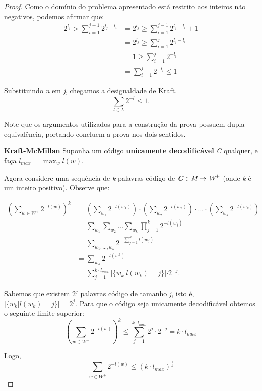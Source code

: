 \begin{lemma}
\begin{proof}
Como o domínio do problema apresentado está restrito aos inteiros não negativos, podemos afirmar que:
\begin{align*}
2^{l_j} > \sum_{i=1}^{j-1} 2^{l_j - l_i} &= 2^{l_j} \geq \sum_{i=1}^{j-1} 2^{l_j - l_i} + 1 \\
&= 2^{l_j} \geq \sum_{i=1}^{j} 2^{l_j - l_i} \\
&= 1 \geq \sum_{i=1}^{j} 2^{-l_i} \\
&=  \sum_{i=1}^{j} 2^{-l_i} \leq 1
\end{align*}

Substituindo \emph{n} em \emph{j}, chegamos a desigualdade de Kraft.
\begin{equation*}
\sum_{l \in L}^{} 2^{-l} \leq 1.
\end{equation*}

Note que os argumentos utilizados para a construção da prova possuem dupla-equivalência, portando concluem a prova nos dois sentidos.

\item \textbf{Kraft-McMillan}
Suponha um código \textbf{unicamente decodificável} \emph{C} qualquer, e faça $l_{max}$ = $\max_{w}l(w)$.

Agora considere uma sequência de \emph{k} palavras código de \textbf{\emph{C} : $\emph{M} \rightarrow \emph{W}^+$} (onde \emph{k} é um inteiro positivo). Observe que:

\begin{align*}
(\sum_{w \in W^+}^{}2^{-l(w)})^k &= (\sum_{w_1}^{}2^{-l(w_1)}) \cdot (\sum_{w_2}^{}2^{-l(w_2)}) \cdot ... \cdot (\sum_{w_k}^{}2^{-l(w_k)}) \\
&= \sum_{w_1}^{} \sum_{w_2}^{} ... \sum_{w_k}^{} \prod_{j = 1}^{k} 2^{-l(w_j)} \\
&= \sum_{w_1,..., w_k}^{} 2^{- \sum_{j=1}^{k} l(w_j)} \\
&= \sum_{w_k}^{} 2^{-l(w^k)} \\
&= \sum_{j=1}^{k \cdot l_{max}} |\{w_k | l(w_k) = j\}| \cdot 2^{-j}.
\end{align*}

Sabemos que existem $2^{j}$ palavras código de tamanho \emph{j}, isto é, $|\{w_k | l(w_k) = j\}| = 2^j$. Para que o código seja unicamente decodificável obtemos o seguinte limite superior:
\begin{equation*}
(\sum_{w \in W^+}^{}2^{-l(w)})^k \leq \sum_{j=1}^{k \cdot l_{max}} 2^j \cdot 2^{-j} = k \cdot l_{max}
\end{equation*}

Logo,
\begin{equation*}
\sum_{w \in W^+}^{}2^{-l(w)} \leq (k \cdot l_{max})^ \frac{1}{k}
\end{equation*}


\end{proof}
\end{lemma}
